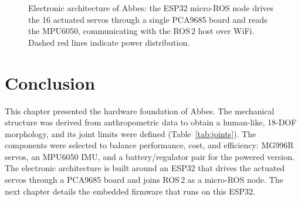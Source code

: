 \begin{figure}[ht]
  \centering
  \caption{Electronic architecture of Abbes: the ESP32 micro-ROS node
           drives the 16 actuated servos through a single PCA9685 board
           and reads the MPU6050, communicating with the ROS\,2 host over
           WiFi. Dashed red lines indicate power distribution.}
  \label{fig:hwarch}
\end{figure}

\section{Conclusion}
This chapter presented the hardware foundation of Abbes. The mechanical
structure was derived from anthropometric data to obtain a human-like,
18-DOF morphology, and its joint limits were defined
(Table~\ref{tab:joints}). The components were selected to balance
performance, cost, and efficiency: MG996R servos, an MPU6050 IMU, and a
battery/regulator pair for the powered version. The electronic
architecture is built around an ESP32 that drives the actuated servos
through a PCA9685 board and joins ROS\,2 as a micro-ROS node. The next chapter
details the embedded firmware that runs on this ESP32.
